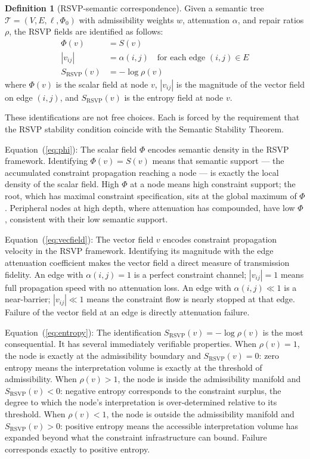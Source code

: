 \documentclass[11pt, a4paper]{article}
\theoremstyle{definition}
\newtheorem{definition}{Definition}
\theoremstyle{remark}
\begin{document}
\begin{definition}[RSVP-semantic correspondence]
Given a semantic tree $\mathcal{T} = (V, E, \ell, \Phi_0)$ with admissibility
weights $w$, attenuation $\alpha$, and repair ratios $\rho$, the RSVP fields
are identified as follows:
\begin{align}
\Phi(v) &= S(v) \label{eq:phi} \\
|v_{ij}| &= \alpha(i,j) \quad \text{for each edge } (i,j) \in E \label{eq:vecfield} \\
S_{\mathrm{RSVP}}(v) &= -\log \rho(v) \label{eq:entropy}
\end{align}
where $\Phi(v)$ is the scalar field at node $v$, $|v_{ij}|$ is the magnitude
of the vector field on edge $(i,j)$, and $S_{\mathrm{RSVP}}(v)$ is the
entropy field at node $v$.
\end{definition}

These identifications are not free choices. Each is forced by the requirement
that the RSVP stability condition coincide with the Semantic Stability Theorem.

Equation~(\ref{eq:phi}): The scalar field $\Phi$ encodes semantic density in
the RSVP framework. Identifying $\Phi(v) = S(v)$ means that semantic support
--- the accumulated constraint propagation reaching a node --- is exactly the
local density of the scalar field. High $\Phi$ at a node means high constraint
support; the root, which has maximal constraint specification, sits at the
global maximum of $\Phi$. Peripheral nodes at high depth, where attenuation
has compounded, have low $\Phi$, consistent with their low semantic support.

Equation~(\ref{eq:vecfield}): The vector field $v$ encodes constraint
propagation velocity in the RSVP framework. Identifying its magnitude with
the edge attenuation coefficient makes the vector field a direct measure of
transmission fidelity. An edge with $\alpha(i,j) = 1$ is a perfect constraint
channel; $|v_{ij}| = 1$ means full propagation speed with no attenuation loss.
An edge with $\alpha(i,j) \ll 1$ is a near-barrier; $|v_{ij}| \ll 1$ means
the constraint flow is nearly stopped at that edge. Failure of the vector
field at an edge is directly attenuation failure.

Equation~(\ref{eq:entropy}): The identification $S_{\mathrm{RSVP}}(v) = -\log\rho(v)$
is the most consequential. It has several immediately verifiable properties.
When $\rho(v) = 1$, the node is exactly at the admissibility boundary and
$S_{\mathrm{RSVP}}(v) = 0$: zero entropy means the interpretation volume is
exactly at the threshold of admissibility. When $\rho(v) > 1$, the node is
inside the admissibility manifold and $S_{\mathrm{RSVP}}(v) < 0$: negative
entropy corresponds to the constraint surplus, the degree to which the node's
interpretation is over-determined relative to its threshold. When $\rho(v) < 1$,
the node is outside the admissibility manifold and $S_{\mathrm{RSVP}}(v) > 0$:
positive entropy means the accessible interpretation volume has expanded beyond
what the constraint infrastructure can bound. Failure corresponds exactly to
positive entropy.
\end{document}
